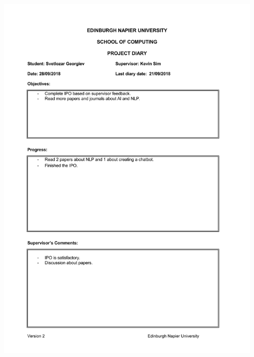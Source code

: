 \documentclass[12pt,a4paper]{article}
\begin{document}
\begin{appendices}
\includegraphics[width=\textwidth,height=\textheight,keepaspectratio]{week3.jpg}
\newpage

\end{appendices}
\end{document}
